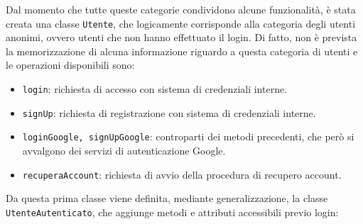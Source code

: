 \documentclass[11pt, a4paper]{article}
\theoremstyle{definition} %
\begin{document}
Dal momento che tutte queste categorie condividono alcune funzionalità, è stata
creata una classe \texttt{Utente}, che logicamente corrisponde alla categoria
degli utenti anonimi, ovvero utenti che non hanno effettuato il login. Di fatto,
non è prevista la memorizzazione di alcuna informazione riguardo a questa categoria
di utenti e le operazioni disponibili sono:
\begin{itemize}
    \item \texttt{login}: richiesta di accesso con sistema di credenziali interne.
    \item \texttt{signUp}: richiesta di registrazione con sistema di credenziali interne.
    \item \texttt{loginGoogle, signUpGoogle}: controparti dei metodi precedenti, che
    però si avvalgono dei servizi di autenticazione Google.

    \item \texttt{recuperaAccount}: richiesta di avvio della procedura di recupero account.
\end{itemize}
Da questa prima classe viene definita, mediante generalizzazione, la classe
\texttt{UtenteAutenticato}, che aggiunge metodi e attributi accessibili previo
login:
\end{document}
